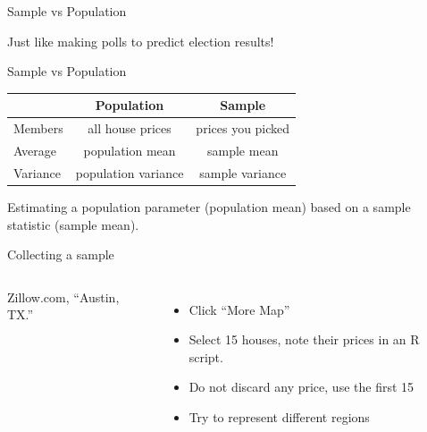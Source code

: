 \documentclass{beamer}\usepackage[]{graphicx}\usepackage[]{color}
\begin{document}
\begin{darkframes}
\begin{frame}[label=lists]{Sample vs Population}
   		
		Just like making polls to predict election results!
		
    \end{frame}    



    \begin{frame}[label=lists]{Sample vs Population}
    	
		
   		
		\begin{table}[!b]
        {\carlitoTLF %
        \begin{tabularx}{\textwidth}{Xcc}
          \textbf{} & \textbf{Population} & \textbf{Sample} \\
          \toprule
          Members       		& all house prices  & prices you picked  \\
          Average               & population mean   & sample mean  \\
          Variance          & population variance   & sample variance \\
          \bottomrule
        \end{tabularx}}
        
      \end{table} \pause
      \quad \newline    		
   		
   		Estimating a \alert{population parameter} (population mean) based on a \alert{sample statistic} (sample mean).
		
		
    \end{frame}  
 

    \begin{frame}[label=lists]{Collecting a sample}
    
    \begin{columns}[onlytextwidth]
        	Zillow.com, ``Austin, TX.'' 
        	\begin{itemize}
   				\item Click ``More Map''
   				\item Select 15 houses, note their prices in an R script. 
   				\item Do not discard any price, use the first 15
   				\item Try to represent different regions
			\end{itemize}
        

\end{columns}
\end{frame}
\end{darkframes}
\end{document}
